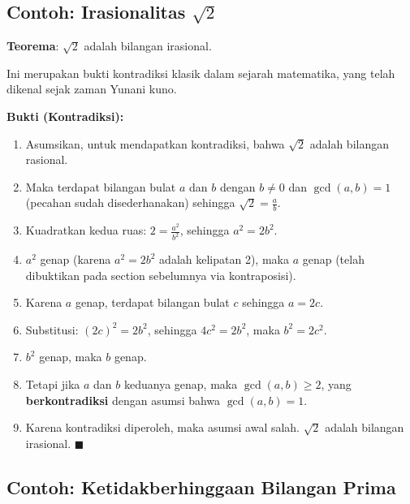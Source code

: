 \subsection{Contoh: Irasionalitas \texorpdfstring{$\sqrt{2}$}{sqrt(2)}}

\begin{contoh}
\textbf{Teorema}: $\sqrt{2}$ adalah bilangan irasional.

Ini merupakan bukti kontradiksi klasik dalam sejarah matematika, yang telah dikenal sejak zaman Yunani kuno.

\textbf{Bukti (Kontradiksi):}
\begin{enumerate}
    \item Asumsikan, untuk mendapatkan kontradiksi, bahwa $\sqrt{2}$ adalah bilangan rasional.
    \item Maka terdapat bilangan bulat $a$ dan $b$ dengan $b \neq 0$ dan $\gcd(a, b) = 1$ (pecahan sudah disederhanakan) sehingga $\sqrt{2} = \frac{a}{b}$.
    \item Kuadratkan kedua ruas: $2 = \frac{a^2}{b^2}$, sehingga $a^2 = 2b^2$.
    \item $a^2$ genap (karena $a^2 = 2b^2$ adalah kelipatan 2), maka $a$ genap (telah dibuktikan pada section sebelumnya via kontraposisi).
    \item Karena $a$ genap, terdapat bilangan bulat $c$ sehingga $a = 2c$.
    \item Substitusi: $(2c)^2 = 2b^2$, sehingga $4c^2 = 2b^2$, maka $b^2 = 2c^2$.
    \item $b^2$ genap, maka $b$ genap.
    \item Tetapi jika $a$ dan $b$ keduanya genap, maka $\gcd(a, b) \geq 2$, yang \textbf{berkontradiksi} dengan asumsi bahwa $\gcd(a, b) = 1$.
    \item Karena kontradiksi diperoleh, maka asumsi awal salah. $\sqrt{2}$ adalah bilangan irasional. $\blacksquare$
\end{enumerate}
\end{contoh}

\subsection{Contoh: Ketidakberhinggaan Bilangan Prima}

